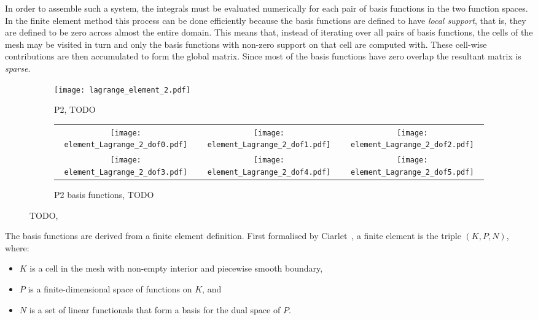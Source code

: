 \documentclass[thesis]{subfiles}
\begin{document}
In order to assemble such a system, the integrals must be evaluated numerically for each pair of basis functions in the two function spaces.
In the finite element method this process can be done efficiently because the basis functions are defined to have \textit{local support}, that is, they are defined to be zero across almost the entire domain.
This means that, instead of iterating over all pairs of basis functions, the cells of the mesh may be visited in turn and only the basis functions with non-zero support on that cell are computed with.
These cell-wise contributions are then accumulated to form the global matrix.
Since most of the basis functions have zero overlap the resultant matrix is \textit{sparse}.

\begin{figure}
  \begin{subfigure}{.3\textwidth}
    \texttt{[image: lagrange\_element\_2.pdf]}
    \caption{P2, TODO}
    \label{fig:lagrange_element_2}
  \end{subfigure}
  \begin{subfigure}{.68\textwidth}
    \begin{tabular}{c c c}
      \texttt{[image: element\_Lagrange\_2\_dof0.pdf]}
      &
      \texttt{[image: element\_Lagrange\_2\_dof1.pdf]}
      &
      \texttt{[image: element\_Lagrange\_2\_dof2.pdf]}
      \\
      \texttt{[image: element\_Lagrange\_2\_dof3.pdf]}
      &
      \texttt{[image: element\_Lagrange\_2\_dof4.pdf]}
      &
      \texttt{[image: element\_Lagrange\_2\_dof5.pdf]}
    \end{tabular}
    \caption{P2 basis functions, TODO}
    \label{fig:lagrange_element_2_basis}
  \end{subfigure}
  \caption{TODO, \cite{defelement}}
\end{figure}

The basis functions are derived from a finite element definition.
First formalised by Ciarlet~\parencite{ciarletElement2002}, a finite element is the triple $(K, P, N)$, where:

\begin{itemize}
  \item $K$ is a cell in the mesh with non-empty interior and piecewise smooth boundary,
  \item $P$ is a finite-dimensional space of functions on $K$, and
  \item $N$ is a set of linear functionals that form a basis for the dual space of $P$.
\end{itemize}
\end{document}
